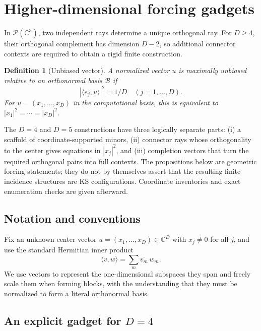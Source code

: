 \documentclass[%
  reprint,
  superscriptaddress,
  showpacs,
  showkeys,
  amsmath,amssymb,
  pra,
  longbibliography,
  floatfix,
  x11names
]{revtex4-2}
\newenvironment{revision}{\begingroup\color{revisionblue}}{\endgroup}
\newtheorem{definition}{Definition}
\begin{document}




\section{Higher-dimensional forcing gadgets}
\label{2025-hdfg}

\begin{revision}
In $\mathcal{P}(\mathbb{C}^3)$, two independent rays determine a unique orthogonal ray.  For $D\geq4$, their orthogonal complement has dimension $D-2$, so additional connector contexts are required to obtain a rigid finite construction.

\begin{definition}[Unbiased vector]
\label{def:unbiased}
A normalized vector $u$ is maximally unbiased relative to an orthonormal basis $\mathcal{B}$ if
\[
|\langle e_j,u\rangle|^2=1/D\quad (j=1,\ldots,D).
\]
For $u=(x_1,\ldots,x_D)$ in the computational basis, this is equivalent to $|x_1|^2=\cdots=|x_D|^2$.
\end{definition}

The $D=4$ and $D=5$ constructions have three logically separate parts: (i) a scaffold of coordinate-supported minors, (ii) connector rays whose orthogonality to the center gives equations in $|x_j|^2$, and (iii) completion vectors that turn the required orthogonal pairs into full contexts.  The propositions below are geometric forcing statements; they do not by themselves assert that the resulting finite incidence structures are KS configurations.  Coordinate inventories and exact enumeration checks are given afterward.
\end{revision}

\subsection{Notation and conventions}
Fix an unknown center vector $u = (x_1,\dots,x_D) \in \mathbb{C}^D$ with $x_j \ne 0$ for all $j$, and use the standard Hermitian inner product
\[
\langle v,w\rangle = \sum_m \overline{v_m}\, w_m.
\]
We use vectors to represent the one-dimensional subspaces they span and freely scale them when forming blocks,
with the understanding that they must be normalized to form a literal orthonormal basis.

\subsection{An explicit gadget for $D=4$}
\end{document}
